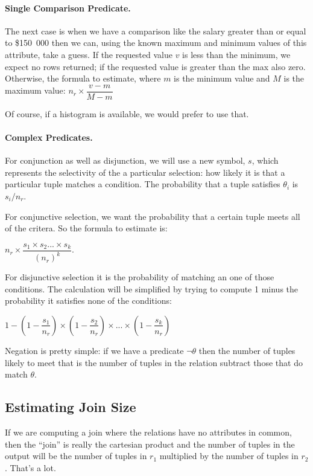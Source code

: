 \paragraph{Single Comparison Predicate.} 
The next case is when we have a comparison like the salary greater than or equal to \$150~000 then we can, using the known maximum and minimum values of this attribute, take a guess. If the requested value $v$ is less than the minimum, we expect no rows returned; if the requested value is greater than the max also zero. Otherwise, the formula to estimate, where $m$ is the minimum value and $M$ is the maximum value: $n_{r} \times \dfrac{v - m}{M - m}$

Of course, if a histogram is available, we would prefer to use that. 

\paragraph{Complex Predicates.}
For conjunction as well as disjunction, we will use a new symbol, $s$, which represents the selectivity of the a particular selection: how likely it is that a particular tuple matches a condition. The probability that a tuple satisfies $\theta_{i}$ is $s_{i}/n_{r}$.

For conjunctive selection, we want the probability that a certain tuple meets all of the critera. So the formula to estimate is:

$n_{r} \times \dfrac{s_{1} \times s_{2}... \times s_{k}}{(n_{r})^{k}}$.

For disjunctive selection it is the probability of matching an one of those conditions. The calculation will be simplified by trying to compute 1 minus the probability it satisfies none of the conditions: 

$1 - (1 - \dfrac{s_{1}}{n_{r}}) \times (1 - \dfrac{s_{2}}{n_{r}}) \times ... \times (1 - \dfrac{s_{k}}{n_{r}})$

Negation is pretty simple: if we have a predicate $\neg\theta$ then the number of tuples likely to meet that is the number of tuples in the relation subtract those that do match $\theta$.

\subsection*{Estimating Join Size}

If we are computing a join where the relations have no attributes in common, then the ``join'' is really the cartesian product and the number of tuples in the output will be the number of tuples in $r_{1}$ multiplied by the number of tuples in $r_{2}$. That's a lot.

